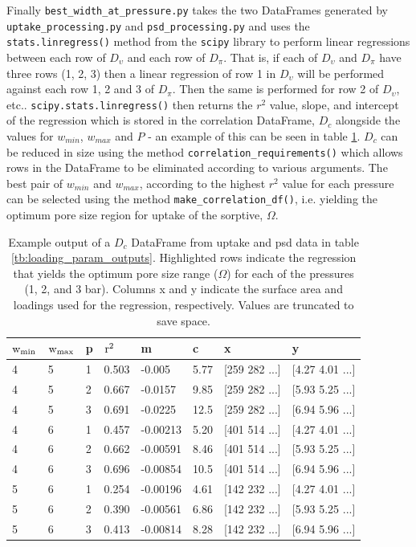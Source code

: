 Finally \verb|best_width_at_pressure.py| takes the two DataFrames generated by \verb|uptake_processing.py| and \verb|psd_processing.py| and uses the \verb|stats.linregress()| method from the \verb|scipy| library\citep{SciPy2020} to perform linear regressions between each row of $D_\upsilon$ and each row of $D_\pi$. That is, if each of $D_\upsilon$ and $D_\pi$ have three rows (1, 2, 3) then a linear regression of row 1 in $D_\upsilon$ will be performed against each row 1, 2 and 3 of $D_\pi$. Then the same is performed for row 2 of $D_\upsilon$, etc.. \verb|scipy.stats.linregress()| then returns the $r^2$ value, slope, and intercept of the regression which is stored in the correlation DataFrame, $D_c$ alongside the values for $w_{min}$, $w_{max}$ and $P$ - an example of this can be seen in table \ref{tb:D_c}. $D_c$ can be reduced in size using the method \verb|correlation_requirements()| which allows rows in the DataFrame to be eliminated according to various arguments. The best pair of $w_{min}$ and $w_{max}$, according to the highest $r^2$ value for each pressure can be selected using the method \verb|make_correlation_df()|, i.e. yielding the optimum pore size region for uptake of the sorptive, $\Omega$.

\begin{table}[t!]
    \centering
    \begin{tabular}{l|l|l|l|l|l|l|l}
        $\rm w_{min}$ & $\rm w_{max}$ & p & $\rm r^2$ & m & c & x & y \\
        \midrule
        \rowcolor{yellow} 4 & 5 & 1 & 0.503 & -0.005 & 5.77 & [259 282 ...] & [4.27 4.01 ...] \\
        \rowcolor{yellow} 4 & 5 & 2 & 0.667 & -0.0157	& 9.85 & [259 282 ...] & [5.93 5.25 ...] \\
        4 & 5 & 3 & 0.691 & -0.0225 & 12.5 & [259 282 ...] & [6.94 5.96 ...] \\
        4 & 6 & 1 & 0.457 & -0.00213 & 5.20 & [401 514 ...] & [4.27 4.01 ...] \\
        4 &	6 & 2 & 0.662 & -0.00591 & 8.46	& [401 514 ...] & [5.93 5.25 ...] \\
        \rowcolor{yellow} 4 & 6 & 3 & 0.696 & -0.00854 & 10.5 & [401 514 ...] & [6.94 5.96 ...] \\
        5 & 6 & 1 & 0.254 & -0.00196 & 4.61 & [142 232 ...] & [4.27 4.01 ...] \\
        5 & 6 & 2 & 0.390 & -0.00561 & 6.86 & [142 232 ...] & [5.93 5.25 ...] \\
        5 & 6 & 3 & 0.413 & -0.00814 & 8.28 & [142 232 ...] & [6.94 5.96 ...] \\
    \end{tabular}
    \caption{Example output of a $D_c$ DataFrame from  uptake and \acrshort{psd} data in table \ref{tb:loading_param_outputs}. Highlighted rows indicate the regression that yields the optimum pore size range ($\Omega$) for each of the pressures (1, 2, and 3 bar). Columns x and y indicate the surface area and loadings used for the regression, respectively. Values are truncated to save space.}
    \label{tb:D_c}
\end{table}



